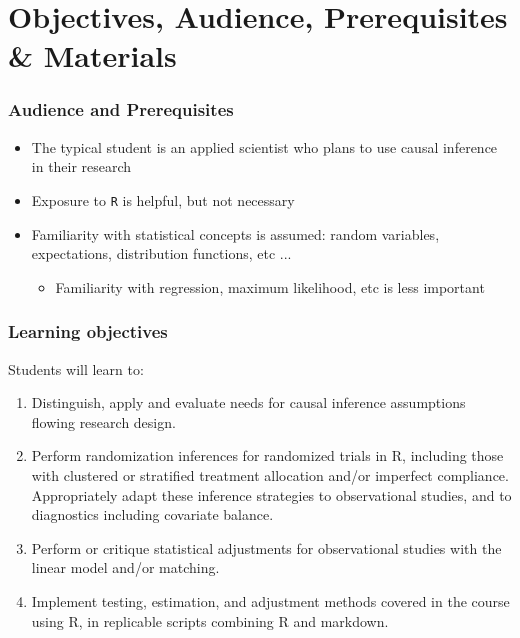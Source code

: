 \documentclass[table, xcolor = {dvipsnames}, 9pt]{beamer}
\theoremstyle{plain}
\begin{document}
\section{Objectives, Audience, Prerequisites \& Materials}
\begin{frame}[t]
\frametitle{Audience and Prerequisites}
\vfill
\begin{itemize} \vfill
\item The typical student is an applied scientist who plans to use causal inference in their research \vfill
\item Exposure to \texttt{R} is helpful, but not necessary \vfill
\item Familiarity with statistical concepts is assumed: random variables, expectations, distribution functions, etc ...
\begin{itemize} \vfill
\item Familiarity with regression, maximum likelihood, etc is less important \vfill
\end{itemize}  \vfill 
\end{itemize} \vfill
\vfill
\end{frame}
\begin{frame}[t]
\frametitle{Learning objectives}
\vfill
Students will learn to:
\begin{enumerate} \vfill
\item Distinguish, apply and evaluate needs for causal inference
  assumptions flowing research design.  \vfill
\item Perform randomization inferences for randomized trials in R,
  including those with clustered or stratified treatment allocation
  and/or imperfect compliance. Appropriately adapt these inference
  strategies to observational studies, and to diagnostics including
  covariate balance.\vfill
\item Perform or critique statistical adjustments for
  observational studies with the linear model and/or matching.\vfill
 \item Implement testing, estimation, and adjustment methods covered in the course using R, in replicable scripts combining R and markdown.
\end{enumerate} \vfill
\vfill
\end{frame}
\end{document}
